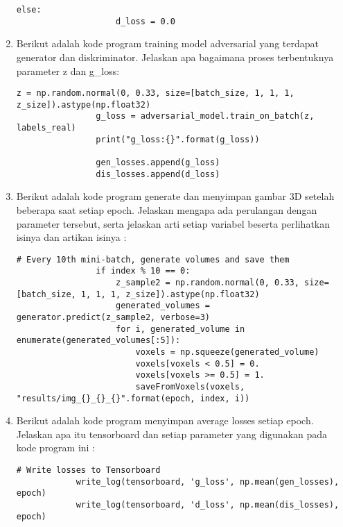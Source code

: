 \begin{enumerate}
\begin{lstlisting}[caption=Training Diskriminator,label={lst:8.11}]
                else:
                    d_loss = 0.0
\end{lstlisting}

\item
Berikut adalah kode program training model adversarial yang terdapat generator dan diskriminator. Jelaskan apa bagaimana proses terbentuknya parameter z dan g\_loss:
\begin{lstlisting}[caption=Training adversarial model,label={lst:8.12}]
                z = np.random.normal(0, 0.33, size=[batch_size, 1, 1, 1, z_size]).astype(np.float32)
                g_loss = adversarial_model.train_on_batch(z, labels_real)
                print("g_loss:{}".format(g_loss))

                gen_losses.append(g_loss)
                dis_losses.append(d_loss)
\end{lstlisting}

\item
Berikut adalah kode program generate dan menyimpan gambar 3D setelah beberapa saat setiap epoch. Jelaskan mengapa ada perulangan dengan parameter tersebut, serta jelaskan arti setiap variabel beserta perlihatkan isinya dan artikan isinya :
\begin{lstlisting}[caption=Buat dan simpan gambar 3D,label={lst:8.13}]
                # Every 10th mini-batch, generate volumes and save them
                if index % 10 == 0:
                    z_sample2 = np.random.normal(0, 0.33, size=[batch_size, 1, 1, 1, z_size]).astype(np.float32)
                    generated_volumes = generator.predict(z_sample2, verbose=3)
                    for i, generated_volume in enumerate(generated_volumes[:5]):
                        voxels = np.squeeze(generated_volume)
                        voxels[voxels < 0.5] = 0.
                        voxels[voxels >= 0.5] = 1.
                        saveFromVoxels(voxels, "results/img_{}_{}_{}".format(epoch, index, i))
\end{lstlisting}

\item
Berikut adalah kode program menyimpan average losses setiap epoch. Jelaskan apa itu tensorboard dan setiap parameter yang digunakan pada kode program ini :
\begin{lstlisting}[caption=Simpan Average losses setiap epoch,label={lst:8.14}]
            # Write losses to Tensorboard
            write_log(tensorboard, 'g_loss', np.mean(gen_losses), epoch)
            write_log(tensorboard, 'd_loss', np.mean(dis_losses), epoch)
\end{lstlisting}


\end{enumerate}
